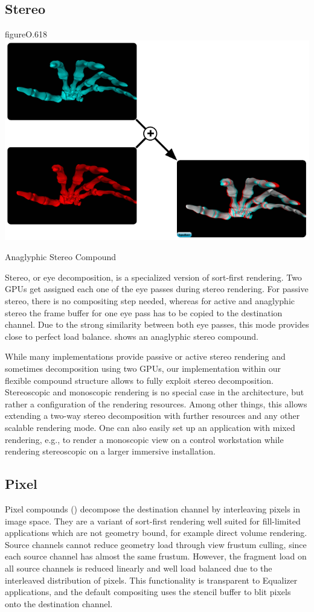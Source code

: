 \subsection{Stereo}

\begin{wrapfloat}{figure}{O}{.618\textwidth}
 \includegraphics[width=.618\textwidth]{images/Stereo}
 {\caption{\label{fStereo}Anaglyphic Stereo Compound}}
\end{wrapfloat}

Stereo, or eye decomposition, is a specialized version of sort-first rendering.
Two GPUs get assigned each one of the eye passes during stereo rendering. For
passive stereo, there is no compositing step needed, whereas for active and
anaglyphic stereo the frame buffer for one eye pass has to be copied to the
destination channel. Due to the strong similarity between both eye passes, this
mode provides close to perfect load balance.  shows an anaglyphic
stereo compound.

While many implementations provide passive or active stereo rendering and
sometimes decomposition using two GPUs, our implementation within our flexible
compound structure allows to fully exploit stereo decomposition.  Stereoscopic
and monoscopic rendering is no special case in the architecture, but rather a
configuration of the rendering resources. Among other things, this allows
extending a two-way stereo decomposition with further resources and any other
scalable rendering mode. One can also easily set up an application with mixed
rendering, e.g., to render a monoscopic view on a control workstation while
rendering stereoscopic on a larger immersive installation.

\subsection{Pixel}

Pixel compounds () decompose the destination channel by
interleaving pixels in image space. They are a variant of sort-first rendering
well suited for fill-limited applications which are not geometry bound, for
example direct volume rendering. Source channels cannot reduce geometry load
through view frustum culling, since each source channel has almost the same
frustum. However, the fragment load on all source channels is reduced linearly
and well load balanced due to the interleaved distribution of pixels. This
functionality is transparent to \textsf{Equalizer} applications, and the
default compositing uses the stencil buffer to blit pixels onto the destination
channel.

